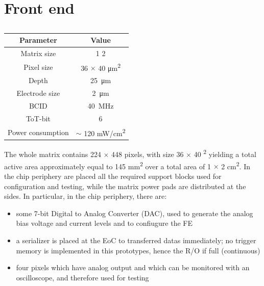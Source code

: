 \section{Front end}
    \begin{table}
        \begin{center}
        \begin{tabular}{| c |c |}
        \hline
        Parameter & Value\\
        \hline
        \hline
        Matrix size &  1 2\\
        Pixel size & 36 $\times$ 40 \si{\um\squared}\\
        Depth & \SI{25}{\um}\\
        Electrode size & \SI{2}{\um}\\
        BCID & \SI{40}{MHz} \\
        ToT-bit & 6 \\
        Power consumption & $\sim$ 120 \si{mW/cm\squared}\\    
        \hline
        \end{tabular}
        \caption{}
        \label{tab:LF-TJ-Monopix}
        \end{center}
    \end{table}
    The whole matrix contains 224 $\times$ 448 pixels, with size 36 $\times$ 40 \si{\mu^2} yielding a total active area approximately equal to 145 \si{mm^2} over a total area of 1 $\times$ 2 \si{cm^2}.
    In the chip periphery are placed all the required support blocks used for configuration and testing, while the matrix power pads are distributed at the sides.
    In particular, in the chip periphery, there are:  
    \begin{itemize}        
        \item some 7-bit Digital to Analog Converter (DAC), used to generate the analog bias voltage and current levels and to confiugure the FE
        \item a serializer is placed at the EoC to transferred datas immediately; no trigger memory is implemented in this prototypes, hence the R/O if full (continuous)
        \item four pixels which have analog output and which can be monitored with an oscilloscope, and therefore used for testing
    \end{itemize}
   
